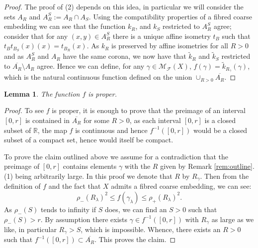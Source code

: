 \documentclass[11pt]{amsart}
\theoremstyle{plain}
\newtheorem{lemma}[theorem]{Lemma}%
\theoremstyle{definition}%
\theoremstyle{remark}%
\begin{document}
{\begin{proof}
The proof of (2) depends on this idea, in particular we will consider the sets $A_{R}$ and $A_{R}^{S}:=A_{R}\cap A_{S}$. Using the compatibility properties of a fibred coarse embedding we can see that the function $k_{R}$, and $k_{S}$ restricted to $A_{R}^{S}$ agree; consider that for any $(x,y)\in A_{R}^{S}$ there is a unique affine isometry $t_{B}$ such that $t_{B}t_{B_{S}}(x)(x) = t_{B_{R}}(x)$. As $k_{R}$ is preserved by affine isometries for all $R>0$ and as $A_{R}^{S}$ and $A_{R}$ have the same corona, we now have that $\tilde{k}_{R}$ and $\tilde{k}_{S}$ restricted to $\overline{A_{R}}\setminus A_{R}$ agree. Hence we can define, for any $\gamma \in \mathcal{M}_{\mathcal{F}}(X)$, $f(\gamma) = \tilde{k}_{R_{\gamma}}(\gamma)$, which is the natural continuous function defined on the union $\cup_{R>0}\overline{A_{R}}$.
\end{proof}


\begin{lemma}\label{lem:MT1-a}
The function $f$ is proper.
\end{lemma}
\begin{proof}
To see $f$ is proper, it is enough to prove that the preimage of an interval $[0,r]$ is contained in $\overline{A_{R}}$ for some $R>0$, as each interval $[0,r]$ is a closed subset of $\mathbb{R}$, the map $f$ is continuous and hence $f^{-1}([0,r])$ would be a closed subset of a compact set, hence would itself be compact.

To prove the claim outlined above we assume for a contradiction that the preimage of $[0,r]$ contains elements $\gamma$ with the $R$ given by Remark \ref{rem:outline}.(1) being arbitrarily large. In this proof we denote that $R$ by $R_{\gamma}$. Then from the definition of $f$ and the fact that $X$ admits a fibred coarse embedding, we can see:
\begin{equation*}
\rho_{-}(R_{\lambda})^{2} \leq f(\gamma_{\lambda}) \leq \rho_{+}(R_{\lambda})^{2}.
\end{equation*}
As $\rho_{-}(S)$ tends to infinity if $S$ does, we can find an $S>0$ such that $\rho_{-}(S)>r$. By assumption there exists $\gamma \in f^{-1}([0,r])$ with $R_{\gamma}$ as large as we like, in particular $R_{\gamma}>S$, which is impossible. Whence, there exists an $R>0$ such that $f^{-1}([0,r]) \subset \overline{A_{R}}$. This proves the claim.
\end{proof}


}
\end{document}
